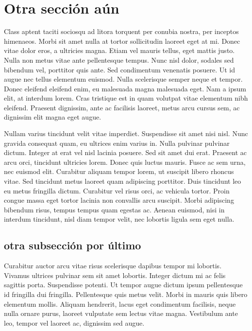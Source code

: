 \documentclass[a4paper,10pt]{article}
\begin{document}
\section{Otra sección aún}
Class aptent taciti sociosqu ad litora torquent per conubia nostra, per inceptos himenaeos. Morbi sit amet nulla at tortor sollicitudin 
laoreet eget at mi. Donec vitae dolor eros, a ultricies magna. Etiam vel mauris tellus, eget mattis justo. Nulla non metus vitae ante 
pellentesque tempus. Nunc nisl dolor, sodales sed bibendum vel, porttitor quis ante. Sed condimentum venenatis posuere. Ut id augue nec 
tellus elementum euismod. Nulla scelerisque semper neque et tempor. Donec eleifend eleifend enim, eu malesuada magna malesuada eget. Nam a 
ipsum elit, at interdum lorem. Cras tristique est in quam volutpat vitae elementum nibh eleifend. Praesent dignissim, ante ac facilisis 
laoreet, metus arcu cursus sem, ac dignissim elit magna eget augue.

Nullam varius tincidunt velit vitae imperdiet. Suspendisse sit amet nisi nisl. Nunc gravida consequat quam, eu ultrices enim varius in. 
Nulla 
pulvinar pulvinar dictum. Integer at erat vel nisl lacinia posuere. Sed sit amet dui erat. Praesent ac arcu orci, tincidunt ultricies 
lorem. 
Donec quis luctus mauris. Fusce ac sem urna, nec euismod elit. Curabitur aliquam tempor lorem, ut suscipit libero rhoncus vitae. Sed 
tincidunt metus laoreet quam adipiscing porttitor. Duis tincidunt leo eu metus fringilla dictum. Curabitur vel risus orci, ac vehicula 
tortor. Proin congue massa eget tortor lacinia non convallis arcu suscipit. Morbi adipiscing bibendum risus, tempus tempus quam egestas 
ac. 
Aenean euismod, nisi in interdum tincidunt, nisl diam tempor velit, nec lobortis ligula sem eget nulla.

\subsection{otra subsección por último}
Curabitur auctor arcu vitae risus scelerisque dapibus tempor mi lobortis. Vivamus ultrices pulvinar sem sit amet lobortis. Integer dictum 
mi 
ac felis sagittis porta. Suspendisse potenti. Ut tempor augue dictum ipsum pellentesque id fringilla dui fringilla. Pellentesque quis 
metus 
velit. Morbi in mauris quis libero elementum mollis. Aliquam hendrerit, lacus eget condimentum facilisis, neque nulla ornare purus, 
laoreet 
vulputate sem lectus vitae magna. Vestibulum ante leo, tempor vel laoreet ac, dignissim sed augue.
\end{document}
